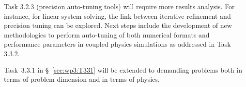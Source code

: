 Task 3.2.3 (precision auto-tuning tools) will require 
more results analysis. For instance, for linear system solving, the link between iterative refinement and precision tuning can be explored.
Next steps include the development of new methodologies to perform auto-tuning of both numerical formats and performance parameters in coupled physics simulations as addressed in Task 3.3.2.

Task~3.3.1 in \S~\ref{sec:wp3:T331} will be extended to demanding problems both in terms of problem dimension and in terms of physics. 








